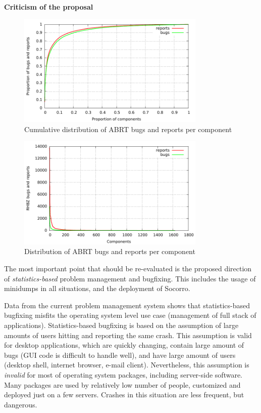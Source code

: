 \documentclass{article}
\begin{document}
\textbf{Criticism of the proposal}

\begin{figure}[h!]
\centering
\includegraphics[width=0.8\textwidth]{abrt-bugs-per-component-cdf.pdf}
\caption{Cumulative distribution of ABRT bugs and reports per
  component}
\label{fig:cumulative}
\end{figure}

\begin{figure}[h!]
\centering
\includegraphics[width=0.8\textwidth]{abrt-bugs-per-component.pdf}
\caption{Distribution of ABRT bugs and reports per component}
\label{fig:distribution}
\end{figure}

The most important point that should be re-evaluated is the proposed
direction of \emph{statistics-based} problem management and
bugfixing. This includes the usage of minidumps in all situations, and
the deployment of Socorro.

Data from the current problem management system shows that
statistics-based bugfixing misfits the operating system level use case
(management of full stack of applications).  Statistics-based
bugfixing is based on the assumption of large amounts of users hitting
and reporting the same crash.  This assumption is valid for desktop
applications, which are quickly changing, contain large amount of bugs
(GUI code is difficult to handle well), and have large amount of users
(desktop shell, internet browser, e-mail client).  Nevertheless, this
assumption is \emph{invalid} for most of operating system packages,
including server-side software. Many packages are used by relatively
low number of people, customized and deployed just on a few servers.
Crashes in this situation are less frequent, but dangerous.
\end{document}
